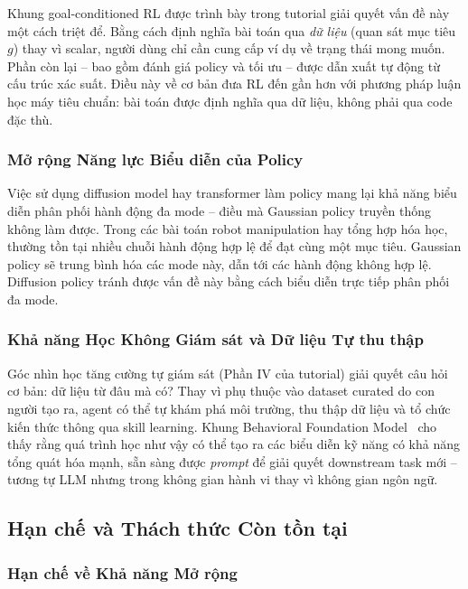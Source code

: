 Khung goal-conditioned RL được trình bày trong tutorial giải quyết vấn đề này một cách triệt để.
Bằng cách định nghĩa bài toán qua \textit{dữ liệu} (quan sát mục tiêu $g$) thay vì scalar,
người dùng chỉ cần cung cấp ví dụ về trạng thái mong muốn.
Phần còn lại -- bao gồm đánh giá policy và tối ưu -- được dẫn xuất tự động từ cấu trúc xác suất.
Điều này về cơ bản đưa RL đến gần hơn với phương pháp luận học máy tiêu chuẩn: bài toán được định
nghĩa qua dữ liệu, không phải qua code đặc thù.

\subsubsection{Mở rộng Năng lực Biểu diễn của Policy}

Việc sử dụng diffusion model hay transformer làm policy mang lại khả năng biểu diễn phân phối hành
động đa mode -- điều mà Gaussian policy truyền thống không làm được.
Trong các bài toán robot manipulation hay tổng hợp hóa học, thường tồn tại nhiều chuỗi hành động hợp lệ
để đạt cùng một mục tiêu.
Gaussian policy sẽ trung bình hóa các mode này, dẫn tới các hành động không hợp lệ.
Diffusion policy tránh được vấn đề này bằng cách biểu diễn trực tiếp phân phối đa mode.

\subsubsection{Khả năng Học Không Giám sát và Dữ liệu Tự thu thập}

Góc nhìn học tăng cường tự giám sát (Phần IV của tutorial) giải quyết câu hỏi cơ bản: dữ liệu từ đâu mà có?
Thay vì phụ thuộc vào dataset curated do con người tạo ra, agent có thể tự khám phá môi trường,
thu thập dữ liệu và tổ chức kiến thức thông qua skill learning.
Khung Behavioral Foundation Model~\cite{eysenbach2025generativerl} cho thấy rằng
quá trình học như vậy có thể tạo ra các biểu diễn kỹ năng có khả năng tổng quát hóa mạnh,
sẵn sàng được \textit{prompt} để giải quyết downstream task mới -- tương tự LLM nhưng trong không gian
hành vi thay vì không gian ngôn ngữ.

\subsection{Hạn chế và Thách thức Còn tồn tại}

\subsubsection{Hạn chế về Khả năng Mở rộng}

